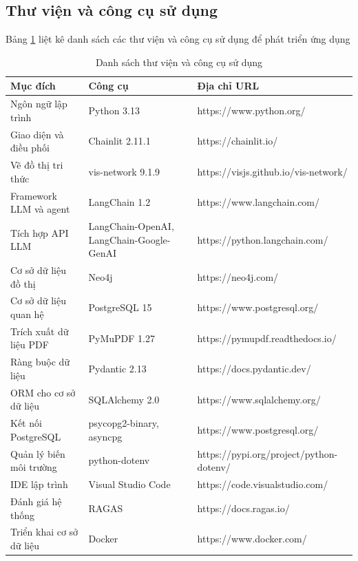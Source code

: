 \documentclass[../DoAn.tex]{subfiles}
\begin{document}
\subsection{Thư viện và công cụ sử dụng}
Bảng \ref{table:my_label} liệt kê danh sách các thư viện và công cụ sử dụng để phát triển ứng dụng
\begin{table}[H]
\centering{}
    \begin{tabular}{|p{5cm}|p{3.5cm}|p{6.5cm}|}
        \hline
        \textbf{Mục đích} & \textbf{Công cụ} & \textbf{Địa chỉ URL} \\ \hline
        Ngôn ngữ lập trình & Python 3.13 & https://www.python.org/ \\ \hline
        Giao diện và điều phối & Chainlit 2.11.1 & https://chainlit.io/ \\ \hline
        Vẽ đồ thị tri thức & vis-network 9.1.9 & https://visjs.github.io/vis-network/ \\ \hline
        Framework LLM và agent & LangChain 1.2 & https://www.langchain.com/ \\ \hline
        Tích hợp API LLM & LangChain-OpenAI, LangChain-Google-GenAI & https://python.langchain.com/ \\ \hline
        Cơ sở dữ liệu đồ thị & Neo4j & https://neo4j.com/ \\ \hline
        Cơ sở dữ liệu quan hệ & PostgreSQL 15 & https://www.postgresql.org/ \\ \hline
        Trích xuất dữ liệu PDF & PyMuPDF 1.27 & https://pymupdf.readthedocs.io/ \\ \hline
        Ràng buộc dữ liệu & Pydantic 2.13 & https://docs.pydantic.dev/ \\ \hline
        ORM cho cơ sở dữ liệu & SQLAlchemy 2.0 & https://www.sqlalchemy.org/ \\ \hline
        Kết nối PostgreSQL & psycopg2-binary, asyncpg & https://www.postgresql.org/ \\ \hline
        Quản lý biến môi trường & python-dotenv & https://pypi.org/project/python-dotenv/ \\ \hline
        IDE lập trình & Visual Studio Code & https://code.visualstudio.com/ \\ \hline
        Đánh giá hệ thống & RAGAS & https://docs.ragas.io/ \\ \hline
        Triển khai cơ sở dữ liệu & Docker & https://www.docker.com/ \\ \hline
    \end{tabular}
    \caption{Danh sách thư viện và công cụ sử dụng}
    \label{table:my_label}
\end{table}
\end{document}
